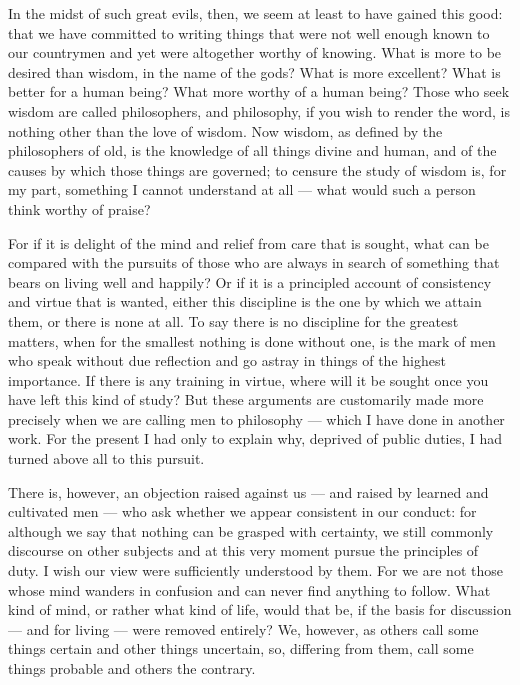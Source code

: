  In the midst of such great evils, then, we seem at least to have gained this good: that we have committed to writing things that were not well enough known to our countrymen and yet were altogether worthy of knowing. What is more to be desired than wisdom, in the name of the gods? What is more excellent? What is better for a human being? What more worthy of a human being? Those who seek wisdom are called philosophers, and philosophy, if you wish to render the word, is nothing other than the love of wisdom. Now wisdom, as defined by the philosophers of old, is the knowledge of all things divine and human, and of the causes by which those things are governed; to censure the study of wisdom is, for my part, something I cannot understand at all — what would such a person think worthy of praise?

 For if it is delight of the mind and relief from care that is sought, what can be compared with the pursuits of those who are always in search of something that bears on living well and happily? Or if it is a principled account of consistency and virtue that is wanted, either this discipline is the one by which we attain them, or there is none at all. To say there is no discipline for the greatest matters, when for the smallest nothing is done without one, is the mark of men who speak without due reflection and go astray in things of the highest importance. If there is any training in virtue, where will it be sought once you have left this kind of study? But these arguments are customarily made more precisely when we are calling men to philosophy — which I have done in another work. For the present I had only to explain why, deprived of public duties, I had turned above all to this pursuit.

 There is, however, an objection raised against us — and raised by learned and cultivated men — who ask whether we appear consistent in our conduct: for although we say that nothing can be grasped with certainty, we still commonly discourse on other subjects and at this very moment pursue the principles of duty. I wish our view were sufficiently understood by them. For we are not those whose mind wanders in confusion and can never find anything to follow. What kind of mind, or rather what kind of life, would that be, if the basis for discussion — and for living — were removed entirely? We, however, as others call some things certain and other things uncertain, so, differing from them, call some things probable and others the contrary.

